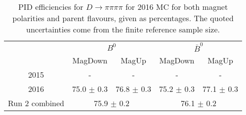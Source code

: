 \begin{table}[H]
    \centering
    \begin{tabular}{ccccc}
        \toprule
        & \multicolumn{2}{c}{$B^0$} &  \multicolumn{2}{c}{$\bar{B}^0$}\\
        & MagDown & MagUp & MagDown & MagUp\\
        \midrule
2015 & - & - & - & - \\
2016 & 75.0 $\pm$ 0.3 & 76.8 $\pm$ 0.3 & 75.2 $\pm$ 0.3 & 77.1 $\pm$ 0.3 \\
        \midrule
Run 2 combined & \multicolumn{2}{c}{75.9 $\pm$ 0.2} & \multicolumn{2}{c}{76.1 $\pm$ 0.2} \\
        \bottomrule
    \end{tabular}
    \caption{PID efficiencies for $D \to \pi\pi\pi\pi$ for 2016 MC for both magnet polarities and parent flavours, given as percentages. The quoted  uncertainties come from the finite reference sample size.}
\label{tab:PID_efficiency_pipipipi}
\end{table}
